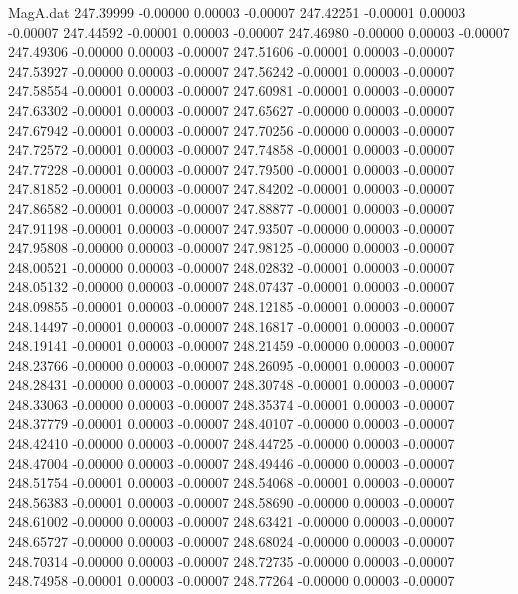 \begin{filecontents}{MagA.dat}
 247.39999   -0.00000    0.00003   -0.00007
 247.42251   -0.00001    0.00003   -0.00007
 247.44592   -0.00001    0.00003   -0.00007
 247.46980   -0.00000    0.00003   -0.00007
 247.49306   -0.00000    0.00003   -0.00007
 247.51606   -0.00001    0.00003   -0.00007
 247.53927   -0.00000    0.00003   -0.00007
 247.56242   -0.00001    0.00003   -0.00007
 247.58554   -0.00001    0.00003   -0.00007
 247.60981   -0.00001    0.00003   -0.00007
 247.63302   -0.00001    0.00003   -0.00007
 247.65627   -0.00000    0.00003   -0.00007
 247.67942   -0.00001    0.00003   -0.00007
 247.70256   -0.00000    0.00003   -0.00007
 247.72572   -0.00001    0.00003   -0.00007
 247.74858   -0.00001    0.00003   -0.00007
 247.77228   -0.00001    0.00003   -0.00007
 247.79500   -0.00001    0.00003   -0.00007
 247.81852   -0.00001    0.00003   -0.00007
 247.84202   -0.00001    0.00003   -0.00007
 247.86582   -0.00001    0.00003   -0.00007
 247.88877   -0.00001    0.00003   -0.00007
 247.91198   -0.00001    0.00003   -0.00007
 247.93507   -0.00000    0.00003   -0.00007
 247.95808   -0.00000    0.00003   -0.00007
 247.98125   -0.00000    0.00003   -0.00007
 248.00521   -0.00000    0.00003   -0.00007
 248.02832   -0.00001    0.00003   -0.00007
 248.05132   -0.00000    0.00003   -0.00007
 248.07437   -0.00001    0.00003   -0.00007
 248.09855   -0.00001    0.00003   -0.00007
 248.12185   -0.00001    0.00003   -0.00007
 248.14497   -0.00001    0.00003   -0.00007
 248.16817   -0.00001    0.00003   -0.00007
 248.19141   -0.00001    0.00003   -0.00007
 248.21459   -0.00000    0.00003   -0.00007
 248.23766   -0.00000    0.00003   -0.00007
 248.26095   -0.00001    0.00003   -0.00007
 248.28431   -0.00000    0.00003   -0.00007
 248.30748   -0.00001    0.00003   -0.00007
 248.33063   -0.00000    0.00003   -0.00007
 248.35374   -0.00001    0.00003   -0.00007
 248.37779   -0.00001    0.00003   -0.00007
 248.40107   -0.00000    0.00003   -0.00007
 248.42410   -0.00000    0.00003   -0.00007
 248.44725   -0.00000    0.00003   -0.00007
 248.47004   -0.00000    0.00003   -0.00007
 248.49446   -0.00000    0.00003   -0.00007
 248.51754   -0.00001    0.00003   -0.00007
 248.54068   -0.00001    0.00003   -0.00007
 248.56383   -0.00001    0.00003   -0.00007
 248.58690   -0.00000    0.00003   -0.00007
 248.61002   -0.00000    0.00003   -0.00007
 248.63421   -0.00000    0.00003   -0.00007
 248.65727   -0.00000    0.00003   -0.00007
 248.68024   -0.00000    0.00003   -0.00007
 248.70314   -0.00000    0.00003   -0.00007
 248.72735   -0.00000    0.00003   -0.00007
 248.74958   -0.00001    0.00003   -0.00007
 248.77264   -0.00000    0.00003   -0.00007

\end{filecontents}
